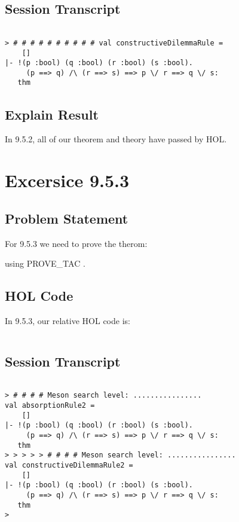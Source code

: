 \documentclass{report}
\begin{document}
\section{Session Transcript}
\label{Session Trans 952}
\setcounter{sessioncount}{0}
\begin{session}
  \begin{scriptsize}
\begin{verbatim}

> # # # # # # # # # # val constructiveDilemmaRule =
    []
|- !(p :bool) (q :bool) (r :bool) (s :bool).
     (p ==> q) /\ (r ==> s) ==> p \/ r ==> q \/ s:
   thm

\end{verbatim}
  \end{scriptsize}
\end{session}
\section{Explain Result}
\label{explain result 952}
In 9.5.2, all of our theorem and theory have passed by HOL.


\chapter{Excersice 9.5.3}
\label{Ex 953}
\section{Problem Statement}
\label{Problem State 953}
For 9.5.3 we need to prove the therom:


using PROVE_TAC .

\section{HOL Code}
\label{HOl Code 953}
In 9.5.3, our relative HOL code is:
\begin{lstlisting}[frame=trBL]
\end{lstlisting}

\section{Session Transcript}
\label{Session Trans 953}
\setcounter{sessioncount}{0}
\begin{session}
  \begin{scriptsize}
\begin{verbatim}

> # # # # Meson search level: ................
val absorptionRule2 =
    []
|- !(p :bool) (q :bool) (r :bool) (s :bool).
     (p ==> q) /\ (r ==> s) ==> p \/ r ==> q \/ s:
   thm
> > > > > # # # # Meson search level: ................
val constructiveDilemmaRule2 =
    []
|- !(p :bool) (q :bool) (r :bool) (s :bool).
     (p ==> q) /\ (r ==> s) ==> p \/ r ==> q \/ s:
   thm
>
\end{verbatim}
  \end{scriptsize}
\end{session}
\end{document}
